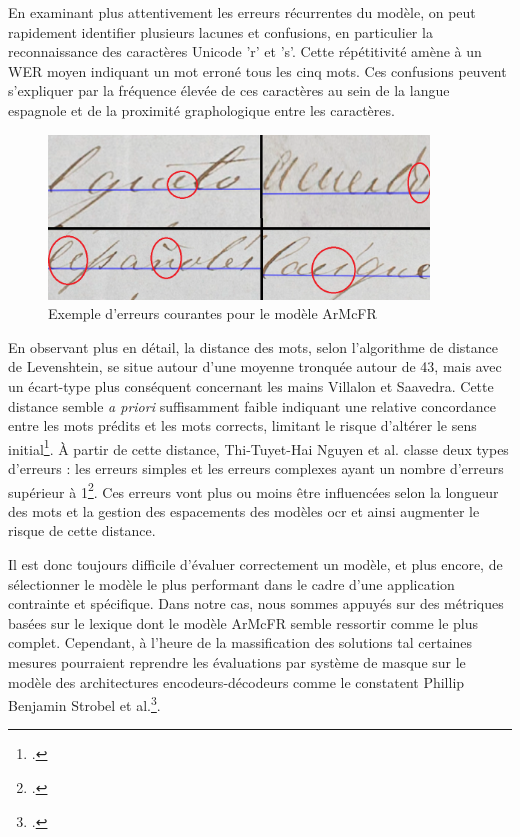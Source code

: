     En examinant plus attentivement les erreurs récurrentes du modèle, on peut rapidement identifier plusieurs lacunes et confusions, en particulier la reconnaissance des caractères Unicode 'r' et 's'. Cette répétitivité amène à un \gls{WER} moyen indiquant un mot erroné tous les cinq mots. Ces confusions peuvent s'expliquer par la fréquence élevée de ces caractères au sein de la langue espagnole et de la proximité graphologique entre les caractères. 
    
    \begin{figure}
        \centering
        \includegraphics[width=0.9\textwidth]{annexes/img/error_HTR.png}
        \caption{Exemple d'erreurs courantes pour le modèle ArMcFR\protect\footnotemark}
        \label{fig:error_htr}
    \end{figure}
    

    
    En observant plus en détail, la distance des mots, selon l'algorithme de distance de Levenshtein, se situe autour d'une moyenne tronquée autour de 43, mais avec un écart-type plus conséquent concernant les mains Villalon et Saavedra. Cette distance semble \textit{a priori} suffisamment faible indiquant une relative concordance entre les mots prédits et les mots corrects, limitant le risque d'altérer le sens initial\footcite{terrielAtelierProductionModele2021}. À partir de cette distance, Thi-Tuyet-Hai Nguyen et al. classe deux types d'erreurs : les erreurs simples et les erreurs complexes ayant un nombre d'erreurs supérieur à 1\footcite{nguyenDeepStatisticalAnalysis2019}. Ces erreurs vont plus ou moins être influencées selon la longueur des mots et la gestion des espacements des modèles \gls{ocr} et ainsi augmenter le risque de cette distance.
    
    Il est donc toujours difficile d'évaluer correctement un modèle, et plus encore, de sélectionner le modèle le plus performant dans le cadre d'une application contrainte et spécifique. Dans notre cas, nous sommes appuyés sur des métriques basées sur le lexique dont le modèle ArMcFR semble ressortir comme le plus complet. Cependant, à l'heure de la massification des solutions \gls{tal} certaines mesures pourraient reprendre les évaluations par système de masque sur le modèle des architectures encodeurs-décodeurs comme le constatent Phillip Benjamin Strobel et al.\footcite{strobelEvaluationHTRModels2022}.
    
